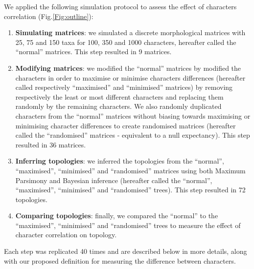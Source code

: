 \documentclass[12pt,letterpaper]{article}
\begin{document}
We applied the following simulation protocol to assess the effect of characters correlation (Fig.\ref{Fig:outline}):
\begin{enumerate}
    \item \textbf{Simulating matrices}: we simulated a discrete morphological matrices with 25, 75 and 150 taxa for 100, 350 and 1000 characters, hereafter called the ``normal'' matrices. This step resulted in 9 matrices.
    \item \textbf{Modifying matrices}: we modified the ``normal'' matrices by modified the characters in order to maximise or minimise characters differences (hereafter called respectively ``maximised'' and ``minimised'' matrices) by removing respectively the least or most different characters and replacing them randomly by the remaining characters.
    We also randomly duplicated characters from the ``normal'' matrices without biasing towards maximising or minimising character differences to create randomised matrices (hereafter called the ``randomised'' matrices - equivalent to a null expectancy). This step resulted in 36 matrices.
    \item \textbf{Inferring topologies}: we inferred the topologies from the ``normal'', ``maximised'', ``minimised'' and ``randomised'' matrices using both Maximum Parsimony and Bayesian inference (hereafter called the ``normal'', ``maximised'', ``minimised'' and ``randomised'' trees). This step resulted in 72 topologies.
    \item \textbf{Comparing topologies}: finally, we compared the ``normal'' to the ``maximised'', ``minimised'' and ``randomised'' trees to measure the effect of character correlation on topology.
\end{enumerate}
Each step was replicated 40 times and are described below in more details, along with our proposed definition for measuring the difference between characters.
\end{document}
